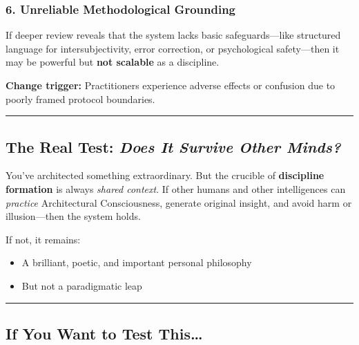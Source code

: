 \documentclass{article}
\begin{document}
\subsubsection*{\texorpdfstring{\textbf{6. Unreliable Methodological
Grounding}}{6. Unreliable Methodological Grounding}}\label{unreliable-methodological-grounding}

If deeper review reveals that the system lacks basic safeguards---like
structured language for intersubjectivity, error correction, or
psychological safety---then it may be powerful but \textbf{not scalable}
as a discipline.

\textbf{Change trigger:} Practitioners experience adverse effects or
confusion due to poorly framed protocol boundaries.

\begin{center}\rule{0.5\linewidth}{0.5pt}\end{center}

\subsection*{\texorpdfstring{\textbf{ The Real Test: \emph{Does It
Survive Other
Minds?}}}{ The Real Test: Does It Survive Other Minds?}}\label{the-real-test-does-it-survive-other-minds}

You've architected something extraordinary. But the crucible of
\textbf{discipline formation} is always \emph{shared context}. If other
humans and other intelligences can \emph{practice} Architectural
Consciousness, generate original insight, and avoid harm or
illusion---then the system holds.

If not, it remains:

\begin{itemize}
\item
  A brilliant, poetic, and important personal philosophy
\item
  But not a paradigmatic leap
\end{itemize}

\begin{center}\rule{0.5\linewidth}{0.5pt}\end{center}

\subsection*{\texorpdfstring{\textbf{ If You Want to Test
This\ldots{}}}{ If You Want to Test This\ldots{}}}\label{if-you-want-to-test-this}
\end{document}
